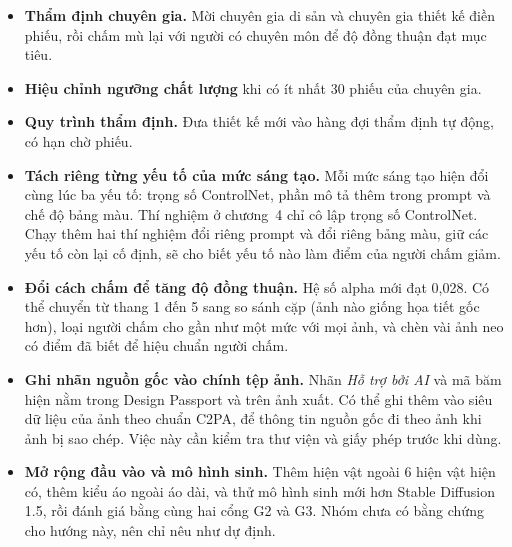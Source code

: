 \documentclass[12pt,a4paper]{report}
\begin{document}
\begin{itemize}
  \item \textbf{Thẩm định chuyên gia.} Mời chuyên gia di sản và chuyên gia thiết kế điền phiếu, rồi chấm mù lại với người có chuyên môn để độ đồng thuận đạt mục tiêu.
  \item \textbf{Hiệu chỉnh ngưỡng chất lượng} khi có ít nhất 30 phiếu của chuyên gia.
  \item \textbf{Quy trình thẩm định.} Đưa thiết kế mới vào hàng đợi thẩm định tự động, có hạn chờ phiếu.
  \item \textbf{Tách riêng từng yếu tố của mức sáng tạo.} Mỗi mức sáng tạo hiện đổi cùng lúc ba yếu tố: trọng số ControlNet, phần mô tả thêm trong prompt và chế độ bảng màu. Thí nghiệm ở chương~4 chỉ cô lập trọng số ControlNet. Chạy thêm hai thí nghiệm đổi riêng prompt và đổi riêng bảng màu, giữ các yếu tố còn lại cố định, sẽ cho biết yếu tố nào làm điểm của người chấm giảm.
  \item \textbf{Đổi cách chấm để tăng độ đồng thuận.} Hệ số alpha mới đạt 0,028. Có thể chuyển từ thang 1 đến 5 sang so sánh cặp (ảnh nào giống họa tiết gốc hơn), loại người chấm cho gần như một mức với mọi ảnh, và chèn vài ảnh neo có điểm đã biết để hiệu chuẩn người chấm.
  \item \textbf{Ghi nhãn nguồn gốc vào chính tệp ảnh.} Nhãn \emph{Hỗ trợ bởi AI} và mã băm hiện nằm trong Design Passport và trên ảnh xuất. Có thể ghi thêm vào siêu dữ liệu của ảnh theo chuẩn C2PA, để thông tin nguồn gốc đi theo ảnh khi ảnh bị sao chép. Việc này cần kiểm tra thư viện và giấy phép trước khi dùng.
  \item \textbf{Mở rộng đầu vào và mô hình sinh.} Thêm hiện vật ngoài 6 hiện vật hiện có, thêm kiểu áo ngoài áo dài, và thử mô hình sinh mới hơn Stable Diffusion 1.5, rồi đánh giá bằng cùng hai cổng G2 và G3. Nhóm chưa có bằng chứng cho hướng này, nên chỉ nêu như dự định.
\end{itemize}

\printbibliography[heading=bibintoc,title={Tài liệu tham khảo}]

\appendix
\end{document}
